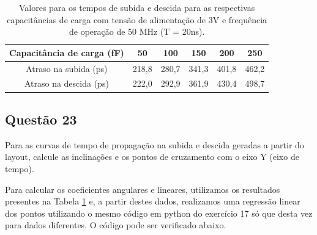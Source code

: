 \documentclass[12pt,a4paper]{article}
\begin{document}
\begin{table}[H]
    \centering
    \caption{Valores para os tempos de subida e descida para as respectivas capacitâncias de carga com tensão de alimentação de 3V e frequência de operação de 50 MHz (T = 20ns).}
    \label{tab:inverter_delay_values}
    \begin{tabular}{cccccc}
        \toprule
        Capacitância de carga (fF) & 50 & 100 & 150 & 200 & 250 \\
        \midrule
        Atraso na subida (ps) & 218,8 & 280,7 & 341,3 & 401,8 & 462,2 \\
        Atraso na descida (ps) & 222,0 & 292,9 & 361,9 & 430,4 & 498,7 \\
        \bottomrule
    \end{tabular}
\end{table}

\subsection*{Questão 23}

Para as curvas de tempo de propagação na subida e descida geradas a partir do layout, calcule as inclinações e os pontos de cruzamento com o eixo Y (eixo de tempo).

Para calcular os coeficientes angulares e lineares, utilizamos os resultados presentes na Tabela \ref{tab:inverter_delay_values} e, a partir destes dados, realizamos uma regressão linear dos pontos utilizando o mesmo código em python do exercício 17 só que desta vez para dados diferentes. O código pode ser verificado abaixo.
\end{document}
